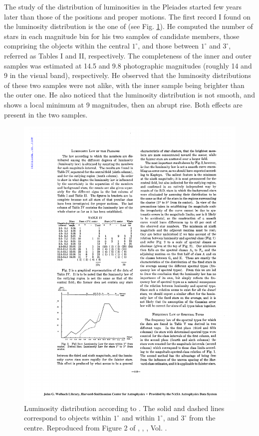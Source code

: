 The study of the distribution of luminosities in the Pleiades started few years later than those of the positions and proper motions. The first record I found on the luminosity distribution is the one of \citet{Trumpler1921} (see Fig. \ref{fig:luminosityTrumpler}). He computed the number of stars in each magnitude bin for his two samples of candidate members, those comprising the objects within the central $1^{\circ}$, and those between $1^{\circ}$ and $3^{\circ}$, referred as Tables I and II, respectively. The completeness of the inner and outer samples was estimated at 14.5 and  9.8 photographic magnitudes (roughly 14 and 9 in the visual band), respectively. He observed that the luminosity distributions of these two samples were not alike, with the inner sample being brighter than the outer one. He also noticed that the luminosity distribution is not smooth, and shows a local minimum at 9 magnitudes, then an abrupt rise. Both effects are present in the two samples.

\begin{figure}[ht!]
\begin{center}
\includegraphics[width=\textwidth]{background/Figures/F2_Trumpler1921.pdf}
\caption{Luminosity distribution according to \citet{Trumpler1921}. The solid and dashed lines correspond to objects within $1^{\circ}$ and within $1^{\circ}$, and $3^{\circ}$ from the centre. Reproduced from Figure 2 of \citet{Trumpler1921}, \textit{}, , Vol. .}
\label{fig:luminosityTrumpler}
\end{center}
\end{figure}

